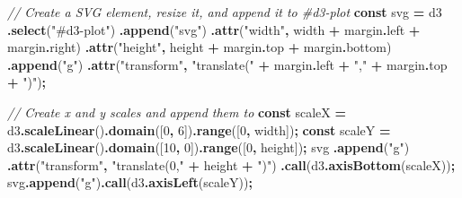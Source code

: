 \documentclass[
  openany]{book}
\newenvironment{Shaded}{\begin{snugshade}}{\end{snugshade}}
\newcommand{\AttributeTok}[1]{\textcolor[rgb]{0.13,0.29,0.53}{#1}}
\newcommand{\CommentTok}[1]{\textcolor[rgb]{0.56,0.35,0.01}{\textit{#1}}}
\newcommand{\DecValTok}[1]{\textcolor[rgb]{0.00,0.00,0.81}{#1}}
\newcommand{\FunctionTok}[1]{\textcolor[rgb]{0.13,0.29,0.53}{\textbf{#1}}}
\newcommand{\KeywordTok}[1]{\textcolor[rgb]{0.13,0.29,0.53}{\textbf{#1}}}
\newcommand{\NormalTok}[1]{#1}
\newcommand{\OperatorTok}[1]{\textcolor[rgb]{0.81,0.36,0.00}{\textbf{#1}}}
\newcommand{\StringTok}[1]{\textcolor[rgb]{0.31,0.60,0.02}{#1}}
\theoremstyle{definition}
\theoremstyle{definition}
\theoremstyle{definition}
\theoremstyle{definition}
\theoremstyle{remark}
\begin{document}
\begin{Shaded}
\begin{Highlighting}[]
\CommentTok{// Create a SVG element, resize it, and append it to \#d3{-}plot}
\KeywordTok{const}\NormalTok{ svg }\OperatorTok{=}\NormalTok{ d3}
  \OperatorTok{.}\FunctionTok{select}\NormalTok{(}\StringTok{"\#d3{-}plot"}\NormalTok{)}
  \OperatorTok{.}\FunctionTok{append}\NormalTok{(}\StringTok{"svg"}\NormalTok{)}
  \OperatorTok{.}\FunctionTok{attr}\NormalTok{(}\StringTok{"width"}\OperatorTok{,}\NormalTok{ width }\OperatorTok{+}\NormalTok{ margin}\OperatorTok{.}\AttributeTok{left} \OperatorTok{+}\NormalTok{ margin}\OperatorTok{.}\AttributeTok{right}\NormalTok{)}
  \OperatorTok{.}\FunctionTok{attr}\NormalTok{(}\StringTok{"height"}\OperatorTok{,}\NormalTok{ height }\OperatorTok{+}\NormalTok{ margin}\OperatorTok{.}\AttributeTok{top} \OperatorTok{+}\NormalTok{ margin}\OperatorTok{.}\AttributeTok{bottom}\NormalTok{)}
  \OperatorTok{.}\FunctionTok{append}\NormalTok{(}\StringTok{"g"}\NormalTok{)}
  \OperatorTok{.}\FunctionTok{attr}\NormalTok{(}\StringTok{"transform"}\OperatorTok{,} 
        \StringTok{"translate("} \OperatorTok{+}\NormalTok{ margin}\OperatorTok{.}\AttributeTok{left} \OperatorTok{+} \StringTok{","} \OperatorTok{+}\NormalTok{ margin}\OperatorTok{.}\AttributeTok{top} \OperatorTok{+} \StringTok{")"}\NormalTok{)}\OperatorTok{;}

\CommentTok{// Create x and y scales and append them to}
\KeywordTok{const}\NormalTok{ scaleX }\OperatorTok{=}\NormalTok{ d3}\OperatorTok{.}\FunctionTok{scaleLinear}\NormalTok{()}\OperatorTok{.}\FunctionTok{domain}\NormalTok{([}\DecValTok{0}\OperatorTok{,} \DecValTok{6}\NormalTok{])}\OperatorTok{.}\FunctionTok{range}\NormalTok{([}\DecValTok{0}\OperatorTok{,}\NormalTok{ width])}\OperatorTok{;}
\KeywordTok{const}\NormalTok{ scaleY }\OperatorTok{=}\NormalTok{ d3}\OperatorTok{.}\FunctionTok{scaleLinear}\NormalTok{()}\OperatorTok{.}\FunctionTok{domain}\NormalTok{([}\DecValTok{10}\OperatorTok{,} \DecValTok{0}\NormalTok{])}\OperatorTok{.}\FunctionTok{range}\NormalTok{([}\DecValTok{0}\OperatorTok{,}\NormalTok{ height])}\OperatorTok{;}
\NormalTok{svg}
  \OperatorTok{.}\FunctionTok{append}\NormalTok{(}\StringTok{"g"}\NormalTok{)}
  \OperatorTok{.}\FunctionTok{attr}\NormalTok{(}\StringTok{"transform"}\OperatorTok{,} \StringTok{"translate(0,"} \OperatorTok{+}\NormalTok{ height }\OperatorTok{+} \StringTok{")"}\NormalTok{)}
  \OperatorTok{.}\FunctionTok{call}\NormalTok{(d3}\OperatorTok{.}\FunctionTok{axisBottom}\NormalTok{(scaleX))}\OperatorTok{;}
\NormalTok{svg}\OperatorTok{.}\FunctionTok{append}\NormalTok{(}\StringTok{"g"}\NormalTok{)}\OperatorTok{.}\FunctionTok{call}\NormalTok{(d3}\OperatorTok{.}\FunctionTok{axisLeft}\NormalTok{(scaleY))}\OperatorTok{;}


\end{Highlighting}
\end{Shaded}
\end{document}
